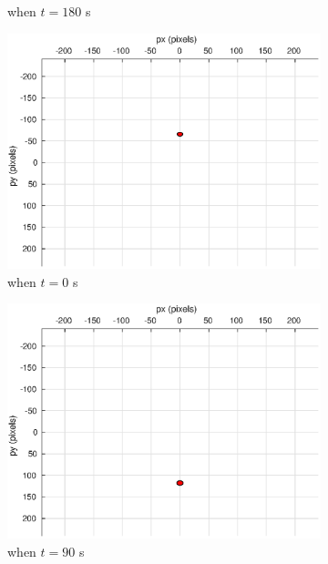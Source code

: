 \begin{figure}[htbp]
\begin{subfigure}[t]{0.32\linewidth}
		\caption{when $t=180$ s}
	\end{subfigure}
	\begin{subfigure}[t]{0.32\linewidth}
		\includegraphics[width=\textwidth]{images/chapter4/inertial_camera_-5mps}
		\caption{when $t=0$ s}
	\end{subfigure}
	\begin{subfigure}[t]{0.32\linewidth}
		\includegraphics[width=\textwidth]{images/chapter4/inertial_camera_-5mps_90s}
		\caption{when $t=90$ s}
	\end{subfigure}
	\begin{subfigure}[t]{0.32\linewidth}

\end{subfigure}
\end{figure}
